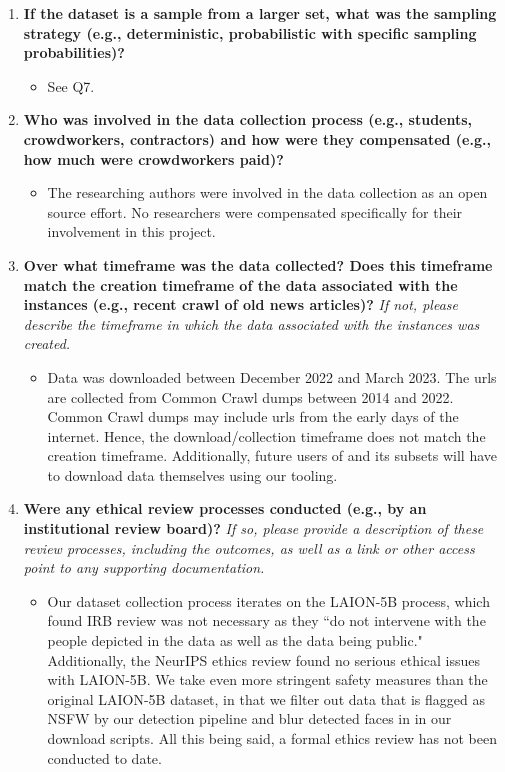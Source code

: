 \begin{enumerate}[label=Q\arabic*]
\item \textbf{If the dataset is a sample from a larger set, what was the sampling strategy (e.g., deterministic, probabilistic with specific sampling probabilities)?}

\begin{itemize}
\item See Q7.
\end{itemize}

\item \textbf{Who was involved in the data collection process (e.g., students, crowdworkers, contractors) and how were they compensated (e.g., how much were crowdworkers paid)?}

\begin{itemize}
\item The researching authors were involved in the data collection as an open source effort. No researchers were compensated specifically for their involvement in this project.
\end{itemize}

\item \textbf{Over what timeframe was the data collected? Does this timeframe match the creation timeframe of the data associated with the instances (e.g., recent crawl of old news articles)?} \textit{If not, please describe the timeframe in which the data associated with the instances was created.}

\begin{itemize}
\item Data was downloaded between December 2022 and March 2023. The urls are collected from Common Crawl dumps between 2014 and 2022. Common Crawl dumps may include urls from the early days of the internet. Hence, the download/collection timeframe does not match the creation timeframe. Additionally, future users of \pool and its subsets will have to download data themselves using our tooling.
\end{itemize}

\item \textbf{Were any ethical review processes conducted (e.g., by an institutional review board)?} \textit{If so, please provide a description of these review processes, including the outcomes, as well as a link or other access point to any supporting documentation.}

\begin{itemize}
\item Our dataset collection process iterates on the LAION-5B process, which found IRB review was not necessary as they ``do not intervene with the people depicted in the data as well as the data being public." Additionally, the NeurIPS ethics review found no serious ethical issues with LAION-5B. We take even more stringent safety measures than the original LAION-5B dataset, in that we filter out data that is flagged as NSFW by our detection pipeline and blur detected faces in \pool in our download scripts. All this being said, a formal ethics review has not been conducted to date.
\end{itemize}


\end{enumerate}
